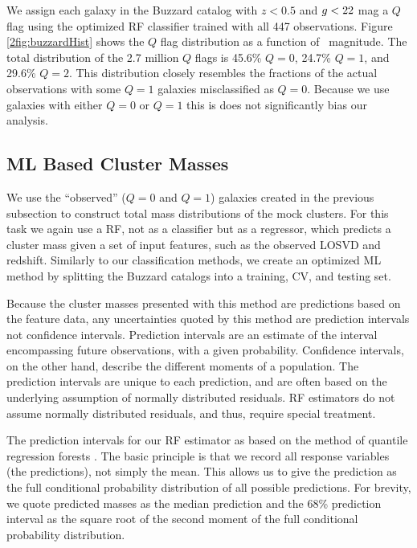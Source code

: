 We assign each galaxy in the Buzzard catalog with $z<0.5$ and $\hbox{$g$}< 22$ mag a $Q$ flag using the optimized RF classifier trained with all 447 observations. Figure \ref{2fig:buzzardHist} shows the $Q$ flag distribution as a function of \sdssr\ magnitude. The total distribution of the 2.7 million $Q$ flags is 45.6\% $Q=0$, 24.7\% $Q=1$, and 29.6\% $Q=2$. This distribution closely resembles the fractions of the actual observations with some $Q=1$ galaxies misclassified as $Q=0$. Because we use galaxies with either $Q=0$ or $Q=1$ this is does not significantly bias our analysis.

\subsection{ML Based Cluster Masses}\label{2sec:ML based cluster masses}
We use the ``observed'' ($Q=0$ and $Q=1$) galaxies created in the previous subsection to construct total mass distributions of the mock clusters. For this task we again use a RF, not as a classifier but as a regressor, which predicts a cluster mass given a set of input features, such as the observed LOSVD and redshift. Similarly to our classification methods, we create an optimized ML method by splitting the Buzzard catalogs into a training, CV, and testing set. 

Because the cluster masses presented with this method are predictions based on the feature data, any uncertainties quoted by this method are prediction intervals not confidence intervals. Prediction intervals are an estimate of the interval encompassing future observations, with a given probability. Confidence intervals, on the other hand, describe the different moments of a population. The prediction intervals are unique to each prediction, and are often based on the underlying assumption of normally distributed residuals. RF estimators do not assume normally distributed residuals, and thus, require special treatment.  

The prediction intervals for our RF estimator as based on the method of quantile regression forests \citep{Meinshausen2006}. The basic principle is that we record all response variables (the predictions), not simply the mean. This allows us to give the prediction as the full conditional probability distribution of all possible predictions. For brevity, we quote predicted masses as the median prediction and the 68\% prediction interval as the square root of the second moment of the full conditional probability distribution.

